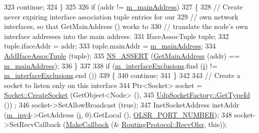 \begin{DoxyCode}
323           \textcolor{keywordflow}{continue};
324         \}
325 
326       \textcolor{keywordflow}{if} (addr != \hyperlink{classns3_1_1olsr_1_1RoutingProtocol_a58cc50ed5d1039aab603e90e318aabfb}{m\_mainAddress})
327         \{
328           \textcolor{comment}{// Create never expiring interface association tuple entries for our}
329           \textcolor{comment}{// own network interfaces, so that GetMainAddress () works to}
330           \textcolor{comment}{// translate the node's own interface addresses into the main address.}
331           IfaceAssocTuple tuple;
332           tuple.ifaceAddr = addr;
333           tuple.mainAddr = \hyperlink{classns3_1_1olsr_1_1RoutingProtocol_a58cc50ed5d1039aab603e90e318aabfb}{m\_mainAddress};
334           \hyperlink{classns3_1_1olsr_1_1RoutingProtocol_a727294984dac11244bf1e92baa141934}{AddIfaceAssocTuple} (tuple);
335           \hyperlink{assert_8h_a6dccdb0de9b252f60088ce281c49d052}{NS\_ASSERT} (\hyperlink{classns3_1_1olsr_1_1RoutingProtocol_ae01451170fb389d322b33ed6d954f460}{GetMainAddress} (addr) == 
      \hyperlink{classns3_1_1olsr_1_1RoutingProtocol_a58cc50ed5d1039aab603e90e318aabfb}{m\_mainAddress});
336         \}
337 
338       \textcolor{keywordflow}{if} (\hyperlink{classns3_1_1olsr_1_1RoutingProtocol_afa7fdc171732e31fb92298d62f6340e6}{m\_interfaceExclusions}.find (\hyperlink{bernuolliDistribution_8m_a6f6ccfcf58b31cb6412107d9d5281426}{i}) != 
      \hyperlink{classns3_1_1olsr_1_1RoutingProtocol_afa7fdc171732e31fb92298d62f6340e6}{m\_interfaceExclusions}.end ())
339         \{
340           \textcolor{keywordflow}{continue};
341         \}
342 
343       \textcolor{comment}{// Create a socket to listen only on this interface}
344       Ptr<Socket> socket = \hyperlink{classns3_1_1Socket_ad448a62bb50ad3dbac59c879a885a8d2}{Socket::CreateSocket} (GetObject<Node> (),
345                                                  \hyperlink{classns3_1_1UdpSocketFactory_ad5b47e944de8861e3dc2b6de1ccbdf5b}{UdpSocketFactory::GetTypeId} ())
      ;
346       socket->SetAllowBroadcast (\textcolor{keyword}{true});
347       InetSocketAddress inetAddr (\hyperlink{classns3_1_1olsr_1_1RoutingProtocol_afede79b25ec57e797ff900ae01bca1df}{m\_ipv4}->GetAddress (\hyperlink{bernuolliDistribution_8m_a6f6ccfcf58b31cb6412107d9d5281426}{i}, 0).GetLocal (), 
      \hyperlink{olsr-routing-protocol_8cc_a56099fb2a14f4a74c5e155c13e9ef8db}{OLSR\_PORT\_NUMBER});
348       socket->SetRecvCallback (\hyperlink{group__makecallbackmemptr_ga9376283685aa99d204048d6a4b7610a4}{MakeCallback} (&
      \hyperlink{classns3_1_1olsr_1_1RoutingProtocol_afa449e39488b5c03609960e66553490e}{RoutingProtocol::RecvOlsr},  \textcolor{keyword}{this}));

\end{DoxyCode}
